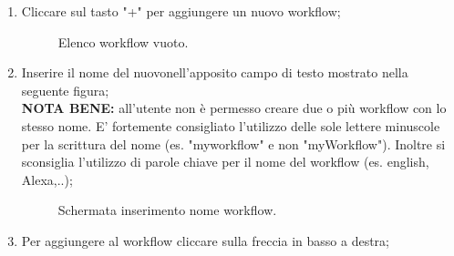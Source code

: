 \begin{enumerate}
\item Cliccare sul tasto "+" per aggiungere un nuovo workflow;

	\begin{figure}[H]
		\centering
		\caption{Elenco workflow vuoto.}
	\end{figure}
\item Inserire il nome del nuovonell'apposito campo di testo mostrato nella seguente figura;\\
\textbf{NOTA BENE:} all'utente non è permesso creare due o più workflow con lo stesso nome. E' fortemente consigliato l'utilizzo delle sole lettere minuscole per la scrittura del nome (es. "myworkflow" e non "myWorkflow"). Inoltre si sconsiglia l'utilizzo di parole chiave per il nome del workflow (es. english, Alexa,..);
	\begin{figure}[H]
		\centering
		\caption{Schermata inserimento nome workflow.}
	\end{figure}
\newpage
\item Per aggiungere al workflow cliccare sulla freccia in basso a destra;


\end{enumerate}
